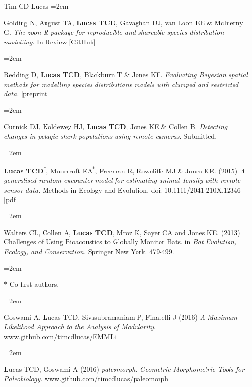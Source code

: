\documentclass{scrartcl}
\newcommand{\MarginText}[1]{\marginpar{\raggedleft\itshape\small#1}} %
\newcommand{\Description}[1]{\hangindent=2em\hangafter=0\noindent\raggedright\footnotesize{#1}\par\normalsize\vspace{1em}} %
\begin{document}
\begin{cv}{Tim {\Large CD} Lucas}
\Description{Golding N, August TA, \textbf{Lucas TCD}, Gavaghan DJ, van Loon EE \& McInerny G. \emph{The zoon R package for reproducible and shareable species distribution modelling}. In Review [\href{https://github.com/zoonproject/zoon_app_paper}{GitHub}]}

\Description{Redding D, \textbf{Lucas TCD}, Blackburn T \& Jones KE. \emph{Evaluating Bayesian spatial methods for modelling species distributions models with clumped and restricted data.} [\href{http://biorxiv.org/content/early/2017/02/06/105742}{preprint}]}


\Description{Curnick DJ, Koldewey HJ, \textbf{Lucas TCD}, Jones KE \& Collen B. \emph{Detecting changes in pelagic shark populations using remote cameras.} Submitted.}

\Description{\MarginText{2015}\textbf{Lucas TCD}\textsuperscript{$\ast$}, Moorcroft EA\textsuperscript{$\ast$}, Freeman R, Rowcliffe MJ \& Jones KE. (2015) \emph{A generalised random encounter model for estimating animal density with remote sensor data.} Methods in Ecology and Evolution. doi: 10.1111/2041-210X.12346 [\href{http://onlinelibrary.wiley.com/doi/10.1111/2041-210X.12346/epdf}{pdf}]}

\Description{\MarginText{2013}Walters CL, Collen A, \textbf{Lucas TCD}, Mroz K, Sayer CA and Jones KE. (2013) Challenges of Using Bioacoustics to Globally Monitor Bats. in \emph{Bat Evolution, Ecology, and Conservation.} Springer New York. 479-499.}

\Description{\MarginText{} \scriptsize{ $\ast$ Co-first authors. } }


\vspace{1em} %



{\color{Maroon}}\vspace{1em}

\Description{\MarginText{On CRAN}Goswami A, {\textbf Lucas TCD}, Sivasubramaniam P, Finarelli J (2016) \emph{A Maximum Likelihood Approach to the Analysis of Modularity}. \url{www.github.com/timcdlucas/EMMLi}}

\Description{{\textbf Lucas TCD}, Goswami A (2016) \emph{paleomorph: Geometric Morphometric Tools for Paleobiology}. \url{www.github.com/timcdlucas/paleomorph}}


\end{cv}
\end{document}
